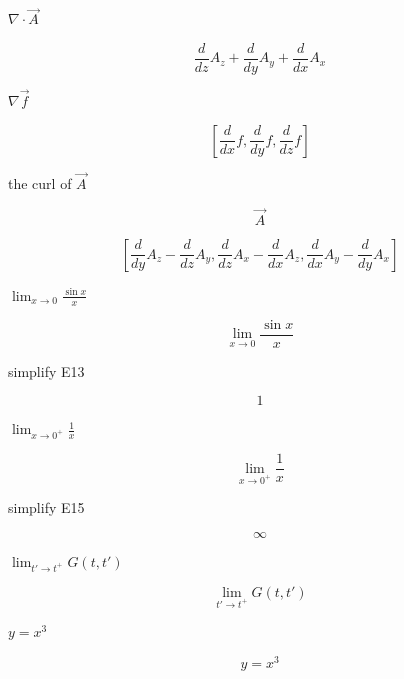\documentclass[dvipdfmx]{article}
\begin{document}
$\nabla \cdot \vec{A}$

\begin{equation}
  \frac{d}{d z} A_{z}+\frac{d}{d y} A_{y}+\frac{d}{d x} A_{x}
  \label{eq:E9}
\end{equation}

$\nabla \vec{f}$

\begin{equation}
  \left[ \frac{d}{d x} f , \frac{d}{d y} f , \frac{d}{d z} f \right]
  \label{eq:E10}
\end{equation}

the curl of $\vec{A}$

\begin{equation}
  \vec{A}
  \label{eq:E11}
\end{equation}

\begin{equation}
  \left[ \frac{d}{d y} A_{z}-\frac{d}{d z} A_{y} , \frac{d}{d z} A_{x}-\frac{d}{d x} A_{z} , \frac{d}{d x} A_{y}-\frac{d}{d y} A_{x} \right]
  \label{eq:E12}
\end{equation}

$\lim_{x \to 0} \frac{\sin x}{x}$

\begin{equation}
  \lim_{x \to 0} \frac{\sin x}{x}
  \label{eq:E13}
\end{equation}

simplify E13

\begin{equation}
  1
  \label{eq:E14}
\end{equation}

$\lim_{x \to 0^+} \frac{1}{x}$

\begin{equation}
  \lim_{x \to 0^+} \frac{1}{x}
  \label{eq:E15}
\end{equation}

simplify E15

\begin{equation}
  \infty
  \label{eq:E16}
\end{equation}

$\lim_{t' \to t^+} G(t,t')$

\begin{equation}
  \lim_{t' \to t^+} G(t,t')
  \label{eq:E17}
\end{equation}

$y = x^3$

\begin{equation}
  y = x^3
  \label{eq:E18}
\end{equation}
\end{document}
